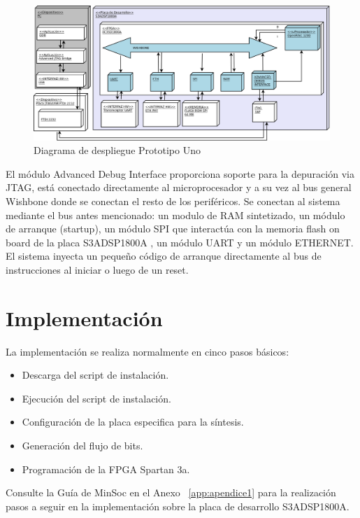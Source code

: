 		\begin{figure}[!h]
 		\begin{center}
  		\includegraphics[width=1\textwidth,keepaspectratio=true]{./images/proto1}
  		\caption{Diagrama de despliegue Prototipo Uno}
  		\label{fig:minsoc}
 		\end{center}
		\end{figure}
		
		El módulo Advanced Debug Interface proporciona soporte para la depuración via JTAG, está conectado directamente al microprocesador y a su vez al bus
		general Wishbone donde se conectan el resto de los periféricos. Se conectan al sistema mediante el bus antes mencionado: un modulo	de RAM
		sintetizado, un módulo de arranque (startup), un módulo SPI que interactúa con la memoria flash on board de la placa S3ADSP1800A , un módulo UART y
		un módulo ETHERNET. El sistema inyecta un pequeño código de arranque directamente al bus de instrucciones al iniciar o luego de un reset. 

\newpage
			
		\section{Implementación}

La implementación se realiza normalmente en cinco pasos básicos: 
\begin {itemize}
\item Descarga del script de instalación.
\item Ejecución del script de instalación.
\item Configuración de la placa especifica para la síntesis.
\item Generación del flujo de bits.
\item Programación de la FPGA Spartan 3a.
 \end {itemize}
 Consulte la Guía de MinSoc en el Anexo ~\ref{app:apendice1} para la realización pasos a seguir en la implementación sobre la placa de desarrollo  S3ADSP1800A.
		

